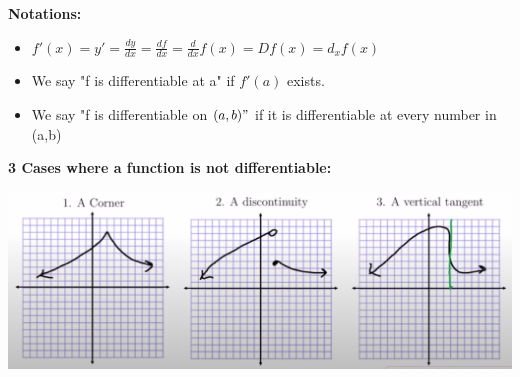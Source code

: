 \documentclass{report}
\begin{document}
        \bigbreak \noindent \bigbreak \noindent 
        \begin{large}
            \textbf{Notations:}
        \end{large}
        \begin{itemize}
            \item $f\prime(x) = y\prime = \frac{dy}{dx} = \frac{df}{dx} = \frac{d}{dx}f(x) = Df(x) = d_xf(x)$
            \item We say "f is differentiable at a" if $f\prime(a)$ exists.
            \item We say "f is differentiable on $(a,b)"$ if it is differentiable at every number in (a,b)
        \end{itemize}
        \bigbreak \noindent \bigbreak \noindent 
        \begin{large}
            \textbf{3 Cases where a function is not differentiable:}
        \end{large}
        \bigbreak \noindent 
        \begin{center}
            \includegraphics[scale=0.4]{../images/31.png}
        \end{center}
\end{document}
